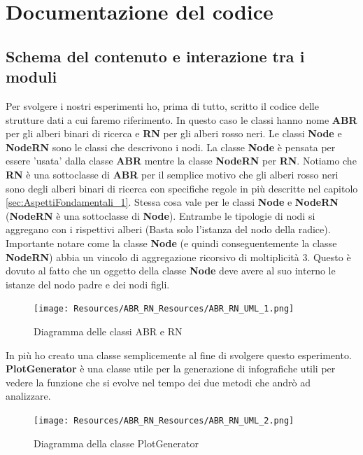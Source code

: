 \newpage
\section{Documentazione del codice}

\subsection{Schema del contenuto e interazione tra i moduli}
\label{sec:SchemaContenutoInterazioneModuli_1}
Per svolgere i nostri esperimenti ho, prima di tutto, scritto il codice delle strutture dati a cui faremo riferimento. In questo caso le classi hanno nome \textbf{ABR} per gli alberi binari di ricerca e \textbf{RN} per gli alberi rosso neri. Le classi \textbf{Node} e \textbf{NodeRN} sono le classi che descrivono i nodi. La classe \textbf{Node} è pensata per essere 'usata' dalla classe \textbf{ABR} mentre la classe \textbf{NodeRN} per \textbf{RN}. Notiamo che \textbf{RN} è una sottoclasse di \textbf{ABR} per il semplice motivo che gli alberi rosso neri sono degli alberi binari di ricerca con specifiche regole in più descritte nel capitolo \ref{sec:AspettiFondamentali_1}. Stessa cosa vale per le classi \textbf{Node} e \textbf{NodeRN} (\textbf{NodeRN} è una sottoclasse di \textbf{Node}). Entrambe le tipologie di nodi si aggregano con i rispettivi alberi (Basta solo l'istanza del nodo della radice). Importante notare come la classe \textbf{Node} (e quindi conseguentemente la classe \textbf{NodeRN}) abbia un vincolo di aggregazione ricorsivo di moltiplicità 3. Questo è dovuto al fatto che un oggetto della classe \textbf{Node} deve avere al suo interno le istanze del nodo padre e dei nodi figli. 

\begin{figure}[H]
    \centering
    \texttt{[image: Resources/ABR\_RN\_Resources/ABR\_RN\_UML\_1.png]}
    \caption{Diagramma delle classi ABR e RN}
    \label{fig:ABR_RN_UML_1}
\end{figure}

In più ho creato una classe semplicemente al fine di svolgere questo esperimento. \textbf{PlotGenerator} è una classe utile per la generazione di infografiche utili per vedere la funzione che si evolve nel tempo dei due metodi che andrò ad analizzare.

\begin{figure}[H]
    \centering
    \texttt{[image: Resources/ABR\_RN\_Resources/ABR\_RN\_UML\_2.png]}
    \caption{Diagramma della classe PlotGenerator}
    \label{fig:ABR_RN_UML_2}
\end{figure}

